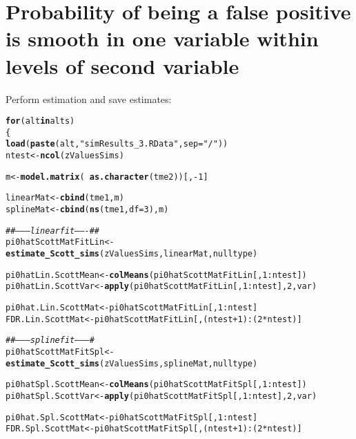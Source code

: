 \documentclass{article}\usepackage[]{graphicx}\usepackage[]{color}
\makeatletter
\newcommand{\hlnum}[1]{\textcolor[rgb]{0.686,0.059,0.569}{#1}}%
\newcommand{\hlstr}[1]{\textcolor[rgb]{0.192,0.494,0.8}{#1}}%
\newcommand{\hlcom}[1]{\textcolor[rgb]{0.678,0.584,0.686}{\textit{#1}}}%
\newcommand{\hlopt}[1]{\textcolor[rgb]{0,0,0}{#1}}%
\newcommand{\hlstd}[1]{\textcolor[rgb]{0.345,0.345,0.345}{#1}}%
\newcommand{\hlkwa}[1]{\textcolor[rgb]{0.161,0.373,0.58}{\textbf{#1}}}%
\newcommand{\hlkwb}[1]{\textcolor[rgb]{0.69,0.353,0.396}{#1}}%
\newcommand{\hlkwc}[1]{\textcolor[rgb]{0.333,0.667,0.333}{#1}}%
\newcommand{\hlkwd}[1]{\textcolor[rgb]{0.737,0.353,0.396}{\textbf{#1}}}%
\newenvironment{kframe}{%
 \def\at@end@of@kframe{}%
 \ifinner\ifhmode%
  \def\at@end@of@kframe{\end{minipage}}%
  \begin{minipage}{\columnwidth}%
 \fi\fi%
 \def\FrameCommand##1{\hskip\@totalleftmargin \hskip-\fboxsep
 \colorbox{shadecolor}{##1}\hskip-\fboxsep
     \hskip-\linewidth \hskip-\@totalleftmargin \hskip\columnwidth}%
 \MakeFramed {\advance\hsize-\width
   \@totalleftmargin\z@ \linewidth\hsize
   \@setminipage}}%
 {\par\unskip\endMakeFramed%
 \at@end@of@kframe}
\newenvironment{knitrout}{}{} %
\makeatother
\begin{document}
\section{Probability of being a false positive is smooth in one variable within levels of second variable}

Perform estimation and save estimates:

\begin{knitrout}
\color{fgcolor}\begin{kframe}
\begin{alltt}
\hlkwa{for}\hlstd{(alt} \hlkwa{in} \hlstd{alts)}
\hlstd{\{}
  \hlkwd{load}\hlstd{(}\hlkwd{paste}\hlstd{(alt,}\hlstr{"simResults_3.RData"}\hlstd{,}\hlkwc{sep}\hlstd{=}\hlstr{"/"}\hlstd{))}
  \hlstd{ntest} \hlkwb{<-} \hlkwd{ncol}\hlstd{(zValuesSims)}

  \hlstd{m} \hlkwb{<-} \hlkwd{model.matrix}\hlstd{(}\hlopt{~}\hlkwd{as.character}\hlstd{(tme2))[,}\hlopt{-}\hlnum{1}\hlstd{]}

  \hlstd{linearMat} \hlkwb{<-} \hlkwd{cbind}\hlstd{(tme1, m)}
  \hlstd{splineMat} \hlkwb{<-} \hlkwd{cbind}\hlstd{(}\hlkwd{ns}\hlstd{(tme1,}\hlkwc{df}\hlstd{=}\hlnum{3}\hlstd{), m)}

  \hlcom{##--------linear fit-------##}
  \hlstd{pi0hatScottMatFitLin} \hlkwb{<-} \hlkwd{estimate_Scott_sims}\hlstd{(zValuesSims, linearMat, nulltype)}

  \hlstd{pi0hatLin.ScottMean} \hlkwb{<-} \hlkwd{colMeans}\hlstd{(pi0hatScottMatFitLin[,}\hlnum{1}\hlopt{:}\hlstd{ntest])}
  \hlstd{pi0hatLin.ScottVar} \hlkwb{<-} \hlkwd{apply}\hlstd{(pi0hatScottMatFitLin[,}\hlnum{1}\hlopt{:}\hlstd{ntest],}\hlnum{2}\hlstd{,var)}

  \hlstd{pi0hat.Lin.ScottMat} \hlkwb{<-} \hlstd{pi0hatScottMatFitLin[,}\hlnum{1}\hlopt{:}\hlstd{ntest]}
  \hlstd{FDR.Lin.ScottMat} \hlkwb{<-} \hlstd{pi0hatScottMatFitLin[,(ntest}\hlopt{+}\hlnum{1}\hlstd{)}\hlopt{:}\hlstd{(}\hlnum{2}\hlopt{*}\hlstd{ntest)]}

  \hlcom{##---------spline fit---------#}
  \hlstd{pi0hatScottMatFitSpl} \hlkwb{<-} \hlkwd{estimate_Scott_sims}\hlstd{(zValuesSims, splineMat, nulltype)}

  \hlstd{pi0hatSpl.ScottMean} \hlkwb{<-} \hlkwd{colMeans}\hlstd{(pi0hatScottMatFitSpl[,}\hlnum{1}\hlopt{:}\hlstd{ntest])}
  \hlstd{pi0hatSpl.ScottVar} \hlkwb{<-} \hlkwd{apply}\hlstd{(pi0hatScottMatFitSpl[,}\hlnum{1}\hlopt{:}\hlstd{ntest],}\hlnum{2}\hlstd{,var)}

  \hlstd{pi0hat.Spl.ScottMat} \hlkwb{<-} \hlstd{pi0hatScottMatFitSpl[,}\hlnum{1}\hlopt{:}\hlstd{ntest]}
  \hlstd{FDR.Spl.ScottMat} \hlkwb{<-} \hlstd{pi0hatScottMatFitSpl[,(ntest}\hlopt{+}\hlnum{1}\hlstd{)}\hlopt{:}\hlstd{(}\hlnum{2}\hlopt{*}\hlstd{ntest)]}


\end{alltt}
\end{kframe}
\end{knitrout}
\end{document}
